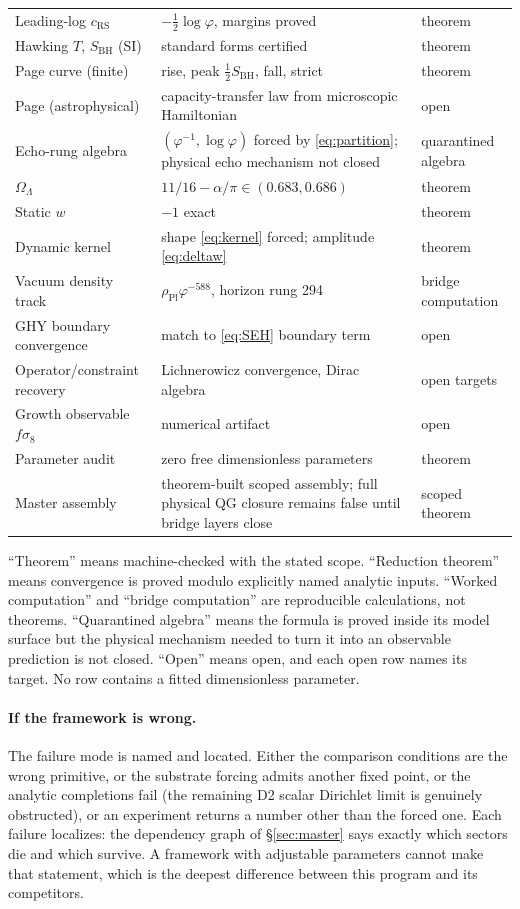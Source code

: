 \documentclass[11pt,letterpaper]{article}
\theoremstyle{definition}
\newcommand{\phiG}{\varphi}
\newcommand{\RS}{\mathrm{RS}}
\newcommand{\Pl}{\mathrm{Pl}}
\newcommand{\BH}{\mathrm{BH}}
\newcommand{\half}{\tfrac{1}{2}}
\begin{document}
\begin{center}
\begin{tabular}{p{4.6cm}p{6.2cm}l}
Leading-log $c_\RS$ & $-\half\log\phiG$, margins proved & theorem \\
Hawking $T$, $S_\BH$ (SI) & standard forms certified & theorem \\
Page curve (finite) & rise, peak $\half S_\BH$, fall, strict
& theorem \\
Page (astrophysical) & capacity-transfer law from microscopic
Hamiltonian & open \\
Echo-rung algebra & $(\phiG^{-1},\log\phiG)$ forced by
\eqref{eq:partition}; physical echo mechanism not closed & quarantined algebra \\
$\Omega_\Lambda$ & $11/16-\alpha/\pi\in(0.683,0.686)$ & theorem \\
Static $w$ & $-1$ exact & theorem \\
Dynamic kernel & shape \eqref{eq:kernel} forced; amplitude
\eqref{eq:deltaw} & theorem \\
Vacuum density track & $\rho_\Pl\phiG^{-588}$, horizon rung 294
& bridge computation \\
GHY boundary convergence & match to \eqref{eq:SEH} boundary term
& open \\
Operator/constraint recovery & Lichnerowicz convergence, Dirac
algebra & open targets \\
Growth observable $f\sigma_8$ & numerical artifact & open \\
Parameter audit & zero free dimensionless parameters & theorem \\
Master assembly & theorem-built scoped assembly; full physical QG
closure remains false until bridge layers close & scoped theorem \\
\bottomrule
\end{tabular}
\end{center}

``Theorem'' means machine-checked with the stated scope.
``Reduction theorem'' means convergence is proved modulo explicitly
named analytic inputs.  ``Worked computation'' and ``bridge
computation'' are reproducible calculations, not theorems.
``Quarantined algebra'' means the formula is proved inside its model
surface but the physical mechanism needed to turn it into an
observable prediction is not closed.  ``Open'' means open, and each
open row names its target.  No row contains a fitted dimensionless
parameter.

\paragraph{If the framework is wrong.}
The failure mode is named and located.  Either the comparison
conditions are the wrong primitive, or the substrate forcing admits
another fixed point, or the analytic completions fail (the remaining
D2 scalar Dirichlet limit is genuinely obstructed), or an experiment
returns a number
other than the forced one.  Each failure localizes: the dependency
graph of \S\ref{sec:master} says exactly which sectors die and which
survive.  A framework with adjustable parameters cannot make that
statement, which is the deepest difference between this program and
its competitors.
\end{document}
